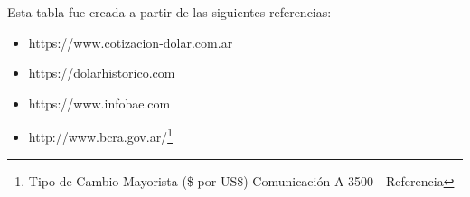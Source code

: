 Esta tabla fue creada a partir de las siguientes referencias:

\begin{itemize}
\item https://www.cotizacion-dolar.com.ar
\item https://dolarhistorico.com
\item https://www.infobae.com
\item http://www.bcra.gov.ar/\footnote{Tipo de Cambio Mayorista (\$ por US\$) Comunicación A 3500 - Referencia}
\end{itemize}
